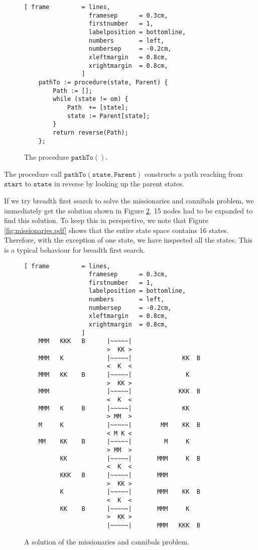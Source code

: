 \begin{figure}[!ht]
\centering
\begin{Verbatim}[ frame         = lines,
                  framesep      = 0.3cm,
                  firstnumber   = 1,
                  labelposition = bottomline,
                  numbers       = left,
                  numbersep     = -0.2cm,
                  xleftmargin   = 0.8cm,
                  xrightmargin  = 0.8cm,
                ]
    pathTo := procedure(state, Parent) {
        Path := [];
        while (state != om) {
            Path  += [state];
            state := Parent[state];
        }
        return reverse(Path);
    };
\end{Verbatim}
\vspace*{-0.3cm}
\caption{The procedure $\mathtt{pathTo}()$.}
\label{fig:pathTo.stlx}
\end{figure}
The procedure call $\mathtt{pathTo}(\mathtt{state}, \mathtt{Parent})$ constructs a path reaching
from $\mathtt{start}$ to $\mathtt{state}$ in reverse by looking up the parent states.

If we try breadth first search to solve the missionaries and cannibals problem, we immediately get
the solution shown in Figure \ref{fig:missionaries.solution}.  15 nodes had to be expanded to find
this solution.  To keep this in perspective, we note that Figure \ref{fig:missionaries.pdf} shows
that the entire state space contains 16 states.  Therefore, with the exception of one state, we have
inspected all the states.  This is a typical behaviour for breadth first search.

\begin{figure}[!ht]
\centering
\begin{Verbatim}[ frame         = lines,
                  framesep      = 0.3cm,
                  firstnumber   = 1,
                  labelposition = bottomline,
                  numbers       = left,
                  numbersep     = -0.2cm,
                  xleftmargin   = 0.8cm,
                  xrightmargin  = 0.8cm,
                ]
    MMM   KKK   B      |~~~~~|
                       >  KK >
    MMM   K            |~~~~~|              KK  B
                       <  K  <
    MMM   KK    B      |~~~~~|               K
                       >  KK >
    MMM                |~~~~~|             KKK  B
                       <  K  <
    MMM   K     B      |~~~~~|              KK
                       > MM  >
    M     K            |~~~~~|        MM    KK  B
                       < M K <
    MM    KK    B      |~~~~~|         M     K
                       > MM  >
          KK           |~~~~~|       MMM     K  B
                       <  K  <
          KKK   B      |~~~~~|       MMM
                       >  KK >
          K            |~~~~~|       MMM    KK  B
                       <  K  <
          KK    B      |~~~~~|       MMM     K
                       >  KK >
                       |~~~~~|       MMM   KKK  B
\end{Verbatim}
\vspace*{-0.3cm}
\caption{A solution of the missionaries and cannibals problem.}
\label{fig:missionaries.solution}
\end{figure}

